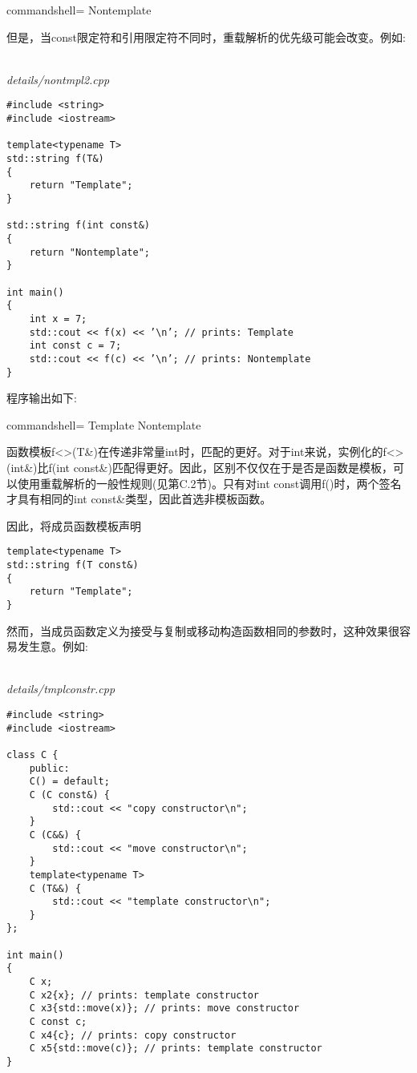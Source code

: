 \begin{tcblisting}{commandshell={}}
Nontemplate
\end{tcblisting}

但是，当const限定符和引用限定符不同时，重载解析的优先级可能会改变。例如:

\hspace*{\fill} \\ %
\noindent
\textit{details/nontmpl2.cpp}
\begin{lstlisting}[style=styleCXX]
#include <string>
#include <iostream>

template<typename T>
std::string f(T&)
{
	return "Template";
}

std::string f(int const&)
{
	return "Nontemplate";
}

int main()
{
	int x = 7;
	std::cout << f(x) << ’\n’; // prints: Template
	int const c = 7;
	std::cout << f(c) << ’\n’; // prints: Nontemplate
}
\end{lstlisting}

程序输出如下:

\begin{tcblisting}{commandshell={}}
Template
Nontemplate
\end{tcblisting}

函数模板f<>(T\&)在传递非常量int时，匹配的更好。对于int来说，实例化的f<>(int\&)比f(int const\&)匹配得更好。因此，区别不仅仅在于是否是函数是模板，可以使用重载解析的一般性规则(见第C.2节)。只有对int const调用f()时，两个签名才具有相同的int const\&类型，因此首选非模板函数。

因此，将成员函数模板声明

\begin{lstlisting}[style=styleCXX]
template<typename T>
std::string f(T const&)
{
	return "Template";
}
\end{lstlisting}

然而，当成员函数定义为接受与复制或移动构造函数相同的参数时，这种效果很容易发生意。例如:

\hspace*{\fill} \\ %
\noindent
\textit{details/tmplconstr.cpp}
\begin{lstlisting}[style=styleCXX]
#include <string>
#include <iostream>

class C {
	public:
	C() = default;
	C (C const&) {
		std::cout << "copy constructor\n";
	}
	C (C&&) {
		std::cout << "move constructor\n";
	}
	template<typename T>
	C (T&&) {
		std::cout << "template constructor\n";
	}
};

int main()
{
	C x;
	C x2{x}; // prints: template constructor
	C x3{std::move(x)}; // prints: move constructor
	C const c;
	C x4{c}; // prints: copy constructor
	C x5{std::move(c)}; // prints: template constructor
}
\end{lstlisting}

